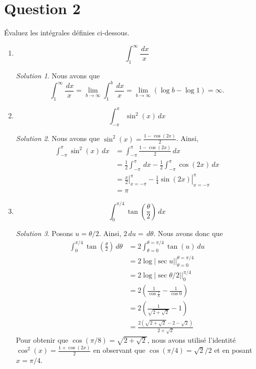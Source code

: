 \documentclass[
  12pt,
  letterpaper,
]{book}
\theoremstyle{remark}
\newtheorem*{solution}{Solution}
\begin{document}
\hypertarget{question-2-2}{%
\section{Question 2}\label{question-2-2}}

Évaluez les intégrales définies ci-dessous.

\begin{enumerate}
\item
  \[\int_{1}^{\infty}\frac{\,dx}{x}\]

  \begin{solution}

  Nous avons que
  \[\int_{1}^{\infty}\frac{\,dx}{x}=\lim_{b\rightarrow\infty}\int_{1}^{b}\frac{\,dx}{x}=\lim_{b\rightarrow\infty}\left(\log b-\log 1\right)=\infty.\]

  \end{solution}
\item
  \[\int_{-\pi}^{\pi}\sin^2(x)\,dx\]

  \begin{solution}

  Nous avons que \(\sin^2(x)=\frac{1-\cos(2x)}{2}\). Ainsi,
  \begin{align}
  \int_{-\pi}^{\pi}\sin^2(x)\,dx&=\int_{-\pi}^{\pi}\frac{1-\cos(2x)}{2}\,dx \\
  &=\frac{1}{2}\int_{-\pi}^{\pi}\,dx-\frac{1}{2}\int_{-\pi}^{\pi}\cos(2x)\,dx \\
  &=\left. \frac{x}{2}\right|_{x=-\pi}^{\pi}-\left. \frac{1}{4}\sin(2x)\right|_{x=-\pi}^{\pi} \\
  &=\pi
  \end{align}

  \end{solution}
\item
  \[\int_{0}^{\pi/4}\tan\left(\frac{\theta}{2}\right)\,dx\]

  \begin{solution}

  Posons \(u=\theta/2\). Ainsi, \(2\,du=\,d\theta\). Nous avons donc que
  \begin{align}
  \int_{0}^{\pi/4}\tan\left(\frac{\theta}{2}\right)\,d\theta&=2\int_{\theta=0}^{\theta=\pi/4}\tan(u)\,du \\
  &=\left. 2\log|\sec u|\right|_{\theta=0}^{\theta=\pi/4} \\
  &=\left. 2\log\left|\sec \theta/2\right|\right|_{0}^{\pi/4} \\
  &=2\left(\frac{1}{\cos \frac{\pi}{8}}-\frac{1}{\cos 0}\right) \\
  &=2\left(\frac{1}{\sqrt{2+\sqrt{2}}}-1\right) \\
  &=\frac{2\left(\sqrt{2+\sqrt{2}}-2-\sqrt{2}\right)}{2+\sqrt{2}}
  \end{align} Pour obtenir que \(\cos(\pi/8)=\sqrt{2+\sqrt{2}}\), nous
  avons utilisé l'identité \(\cos^2(x)=\frac{1+\cos(2x)}{2}\) en
  observant que \(\cos(\pi/4)=\sqrt{2}/2\) et en posant \(x=\pi/4\).

  \end{solution}
\end{enumerate}
\end{document}
